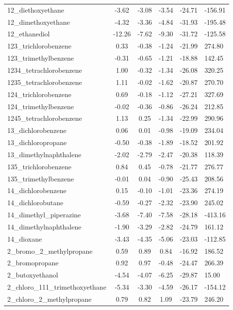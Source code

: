 \documentclass{amsart}
\begin{document}
\begin{longtable}{L|C|C|C|X|X}
12\_diethoxyethane & -3.62 & -3.08 & -3.54 & -24.71 & -156.91 \\ 
12\_dimethoxyethane & -4.32 & -3.36 & -4.84 & -31.93 & -195.48 \\ 
12\_ethanediol & -12.26 & -7.62 & -9.30 & -31.72 & -125.58 \\ 
123\_trichlorobenzene & 0.33 & -0.38 & -1.24 & -21.99 & 274.80 \\ 
123\_trimethylbenzene & -0.31 & -0.65 & -1.21 & -18.88 & 142.45 \\ 
1234\_tetrachlorobenzene & 1.00 & -0.32 & -1.34 & -26.08 & 320.25 \\ 
1235\_tetrachlorobenzene & 1.11 & -0.02 & -1.62 & -20.87 & 270.70 \\ 
124\_trichlorobenzene & 0.69 & -0.18 & -1.12 & -27.21 & 327.69 \\ 
124\_trimethylbenzene & -0.02 & -0.36 & -0.86 & -26.24 & 212.85 \\ 
1245\_tetrachlorobenzene & 1.13 & 0.25 & -1.34 & -22.99 & 290.96 \\ 
13\_dichlorobenzene & 0.06 & 0.01 & -0.98 & -19.09 & 234.04 \\ 
13\_dichloropropane & -0.50 & -0.38 & -1.89 & -18.52 & 201.92 \\ 
13\_dimethylnaphthalene & -2.02 & -2.79 & -2.47 & -20.38 & 118.39 \\ 
135\_trichlorobenzene & 0.84 & 0.45 & -0.78 & -21.77 & 276.77 \\ 
135\_trimethylbenzene & -0.01 & 0.04 & -0.90 & -25.43 & 208.56 \\ 
14\_dichlorobenzene & 0.15 & -0.10 & -1.01 & -23.36 & 274.19 \\ 
14\_dichlorobutane & -0.59 & -0.27 & -2.32 & -23.90 & 245.02 \\ 
14\_dimethyl\_piperazine & -3.68 & -7.40 & -7.58 & -28.18 & -413.16 \\ 
14\_dimethylnaphthalene & -1.90 & -3.29 & -2.82 & -24.79 & 161.12 \\ 
14\_dioxane & -3.43 & -4.35 & -5.06 & -23.03 & -112.85 \\ 
2\_bromo\_2\_methylpropane & 0.59 & 0.89 & 0.84 & -16.92 & 186.52 \\ 
2\_bromopropane & 0.92 & 0.97 & -0.48 & -24.47 & 266.39 \\ 
2\_butoxyethanol & -4.54 & -4.07 & -6.25 & -29.87 & 15.00 \\ 
2\_chloro\_111\_trimethoxyethane & -5.34 & -3.30 & -4.59 & -26.17 & -154.12 \\ 
2\_chloro\_2\_methylpropane & 0.79 & 0.82 & 1.09 & -23.79 & 246.20 \\ 

\end{longtable}
\end{document}
